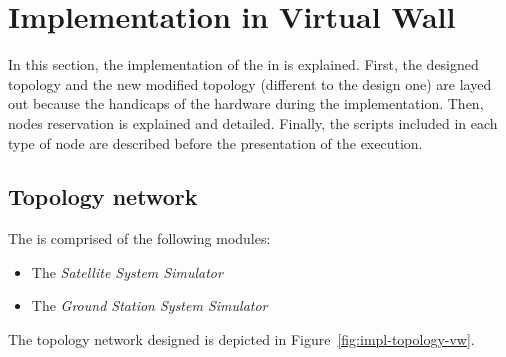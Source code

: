 
\section{Implementation in Virtual Wall}
\label{sec:impl-vw}





In this section, the implementation of the \sss in \vw is explained. First, the designed
topology and the new modified topology (different to the design one) are layed out because
the handicaps of the hardware during the implementation. Then, nodes reservation is
explained and detailed. Finally, the scripts included in each type of node are described
before the presentation of the execution.





\subsection{Topology network}

The \sss is comprised of the
following modules:
\begin{itemize}
\item The \emph{Satellite System Simulator}
\item The \emph{Ground Station System Simulator}
\end{itemize}
The topology network designed is depicted in Figure~\ref{fig:impl-topology-vw}.

